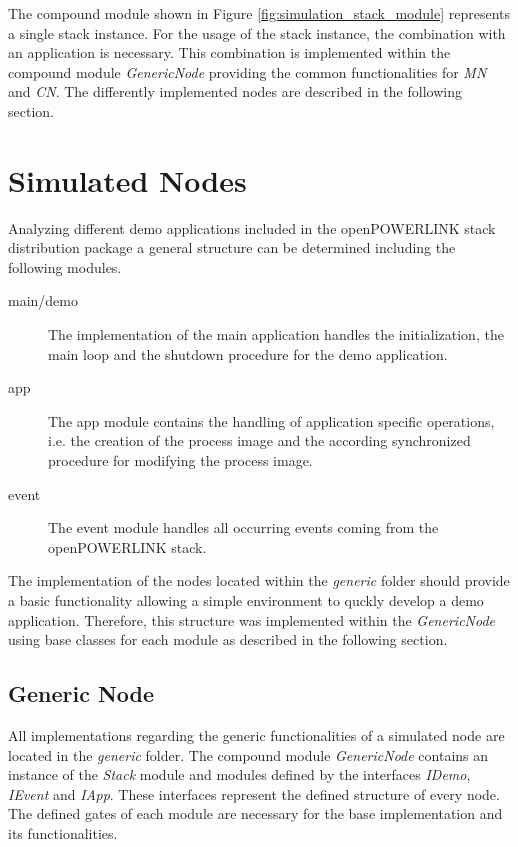 The compound module shown in Figure  \ref{fig:simulation_stack_module} represents a single stack instance.
For the usage of the stack instance, the combination with an application is necessary.
This combination is implemented within the compound module \emph{GenericNode} providing the common functionalities for \emph{MN} and \emph{CN}.
The differently implemented nodes are described in the following section.

\section{Simulated Nodes}
\label{sec:porting_nodes}
Analyzing different demo applications included in the openPOWERLINK stack distribution package a general structure can be determined including the following modules.

\begin{description}
    \item[main/demo] The implementation of the main application handles the initialization, the main loop and the shutdown procedure for the demo application.
    \item[app] The app module contains the handling of application specific operations, i.e. the creation of the process image and the according synchronized procedure for modifying the process image.
    \item[event] The event module handles all occurring events coming from the openPOWERLINK stack.
\end{description}

The implementation of the nodes located within the \emph{generic} folder should provide a basic functionality allowing a simple environment to quckly develop a demo application.
Therefore, this structure was implemented within the \emph{GenericNode} using base classes for each module as described in the following section.

\subsection{Generic Node}
\label{sec:porting_nodes_generic}
All implementations regarding the generic functionalities of a simulated node are located in the \emph{generic} folder.
The compound module \emph{GenericNode} contains an instance of the \emph{Stack} module and modules defined by the interfaces \emph{IDemo}, \emph{IEvent} and \emph{IApp}.
These interfaces represent the defined structure of every node.
The defined gates of each module are necessary for the base implementation and its functionalities.

